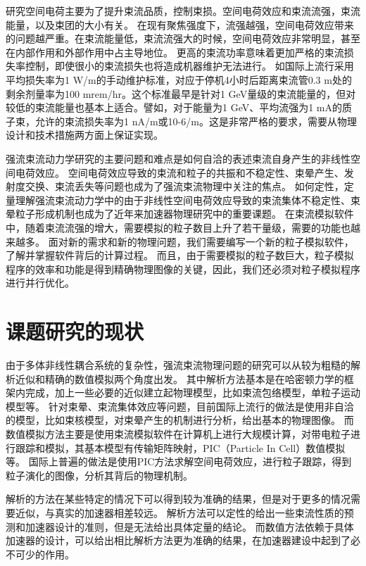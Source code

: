 研究空间电荷主要为了提升束流品质，控制束损。空间电荷效应和束流流强，束流能量，以及束团的大小有关。
在现有聚焦强度下，流强越强，空间电荷效应带来的问题越严重。在束流能量低，束流流强大的时候，空间电荷效应非常明显，甚至在内部作用和外部作用中占主导地位。
更高的束流功率意味着更加严格的束流损失率控制，即使很小的束流损失也将造成机器维护无法进行。
如国际上流行采用平均损失率为1 W/m的手动维护标准，对应于停机4小时后距离束流管0.3 m处的剩余剂量率为100 mrem/hr。这个标准最早是针对1 GeV量级的束流能量的，但对较低的束流能量也基本上适合。譬如，对于能量为1 GeV、平均流强为1 mA的质子束，允许的束流损失率为1 nA/m或10-6/m。这是非常严格的要求，需要从物理设计和技术措施两方面上保证实现。

强流束流动力学研究的主要问题和难点是如何自洽的表述束流自身产生的非线性空间电荷效应。
空间电荷效应导致的束流和粒子的共振和不稳定性、束晕产生、发射度交换、束流丢失等问题也成为了强流束流物理中关注的焦点。
如何定性，定量理解强流束流动力学中的由于非线性空间电荷效应导致的束流集体不稳定性、束晕粒子形成机制也成为了近年来加速器物理研究中的重要课题。
在束流模拟软件中，随着束流流强的增大，需要模拟的粒子数目上升了若干量级，需要的功能也越来越多。
面对新的需求和新的物理问题，我们需要编写一个新的粒子模拟软件，了解并掌握软件背后的计算过程。
而且，由于需要模拟的粒子数巨大，粒子模拟程序的效率和功能是得到精确物理图像的关键，因此，我们还必须对粒子模拟程序进行并行优化。

\section{课题研究的现状}
由于多体非线性耦合系统的复杂性，强流束流物理问题的研究可以从较为粗糙的解析近似和精确的数值模拟两个角度出发。
其中解析方法基本是在哈密顿力学的框架内完成，加上一些必要的近似建立起物理模型，比如束流包络模型，单粒子运动模型等。
针对束晕、束流集体效应等问题，目前国际上流行的做法是使用非自洽的模型，比如束核模型，对束晕产生的机制进行分析，给出基本的物理图像。
而数值模拟方法主要是使用束流模拟软件在计算机上进行大规模计算，对带电粒子进行跟踪和模拟，其基本模型有传输矩阵映射，PIC（Particle In Cell）数值模拟等。
国际上普遍的做法是使用PIC方法求解空间电荷效应，进行粒子跟踪，得到粒子演化的图像，分析其背后的物理机制。

解析的方法在某些特定的情况下可以得到较为准确的结果，但是对于更多的情况需要近似，与真实的加速器相差较远。
解析方法可以定性的给出一些束流性质的预测和加速器设计的准则，但是无法给出具体定量的结论。
而数值方法依赖于具体加速器的设计，可以给出相比解析方法更为准确的结果，在加速器建设中起到了必不可少的作用。

